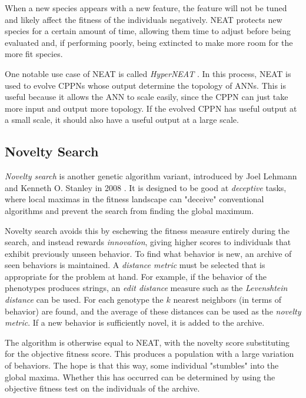 When a new species appears with a new feature,
the feature will not be tuned and likely affect the fitness of the individuals negatively.
NEAT protects new species for a certain amount of time,
allowing them time to adjust before being evaluated and, if performing poorly, being extincted to make more room for the more fit species.

One notable use case of NEAT is called \textit{HyperNEAT} \cite{stanley2009hypercube}.
In this process, NEAT is used to evolve CPPNs whose output determine the topology of ANNs.
This is useful because it allows the ANN to scale easily, since the CPPN can just take more input and output more topology.
If the evolved CPPN has useful output at a small scale, it should also have a useful output at a large scale.

\subsection{Novelty Search}
\textit{Novelty search} is another genetic algorithm variant, introduced by Joel Lehmann and Kenneth O. Stanley in 2008 \cite{lehman-2008}.
It is designed to be good at \textit{deceptive} tasks, where local maximas in the fitness landscape can "deceive" conventional algorithms and prevent the search from finding the global maximum.

Novelty search avoids this by eschewing the fitness measure entirely during the search,
and instead rewards \textit{innovation}, giving higher scores to individuals that exhibit previously unseen behavior.
To find what behavior is new, an archive of seen behaviors is maintained.
A \textit{distance metric} must be selected that is appropriate for the problem at hand.
For example, if the behavior of the phenotypes produces strings, an \textit{edit distance} measure such as the \textit{Levenshtein distance} can be used.
For each genotype the $k$ nearest neighbors (in terms of behavior) are found, and the average of these distances can be used as the \textit{novelty metric}.
If a new behavior is sufficiently novel, it is added to the archive.

The algorithm is otherwise equal to NEAT, with the novelty score substituting for the objective fitness score.
This produces a population with a large variation of behaviors.
The hope is that this way, some individual "stumbles" into the global maxima.
Whether this has occurred can be determined by using the objective fitness test on the individuals of the archive.
